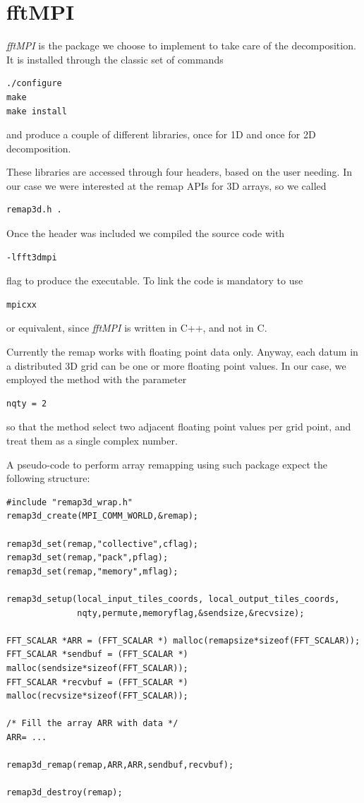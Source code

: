 \section{fftMPI}
\emph{fftMPI} is the package we choose to implement to take care of the decomposition. It is installed through the classic set of commands 
\begin{lstlisting}
./configure 
make 
make install
\end{lstlisting}
and produce a couple of different libraries, once for 1D and once for 2D decomposition.
\par
These libraries are accessed through four headers, based on the user needing. In our case we were interested at the remap APIs for 3D arrays, so we called 
\begin{lstlisting} 
remap3d.h .
\end{lstlisting}
Once the header was included we compiled the source code with 
\begin{lstlisting}
-lfft3dmpi
\end{lstlisting}
flag to produce the executable. To link the code is mandatory to use 
\begin{lstlisting}
mpicxx
\end{lstlisting}
or equivalent, since \emph{fftMPI} is written in C++, and not in C. \\
\par
Currently the remap works with floating point data only. Anyway, each datum in a distributed 3D grid can be one or more floating point values. In our case, we employed the method with the parameter
\begin{lstlisting}
nqty = 2
\end{lstlisting}
so that the method select two adjacent floating point values per grid point, and treat them as a single complex number. \\
\par
A pseudo-code to perform array remapping using such package expect the following structure:
\begin{lstlisting}
#include "remap3d_wrap.h" 
remap3d_create(MPI_COMM_WORLD,&remap);

remap3d_set(remap,"collective",cflag);
remap3d_set(remap,"pack",pflag);
remap3d_set(remap,"memory",mflag); 

remap3d_setup(local_input_tiles_coords, local_output_tiles_coords,
              nqty,permute,memoryflag,&sendsize,&recvsize); 
              
FFT_SCALAR *ARR = (FFT_SCALAR *) malloc(remapsize*sizeof(FFT_SCALAR));
FFT_SCALAR *sendbuf = (FFT_SCALAR *) malloc(sendsize*sizeof(FFT_SCALAR));
FFT_SCALAR *recvbuf = (FFT_SCALAR *) malloc(recvsize*sizeof(FFT_SCALAR)); 

/* Fill the array ARR with data */
ARR= ...

remap3d_remap(remap,ARR,ARR,sendbuf,recvbuf); 

remap3d_destroy(remap); 
\end{lstlisting}
